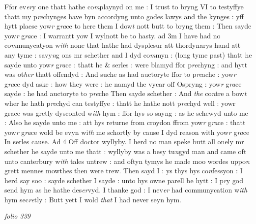 \documentclass[12pt, a4paper]{book}
\begin{document}
Ffor ev\textit{er}y one thatt hathe co\textit{m}playnyd on me : I trust to bryng VI to testyffye thatt my p\textit{re}chynges have byn accordyng unto godes lawys and the kynges : yff hytt plaese yow\textit{r} g\textit{ra}ce to here them I dow\textit{t} nott butt to bryng them : Then sayde yow\textit{r} g\textit{ra}ce : I warrantt yow I wylnott be to hasty.  ad 3m I have had no co\textit{m}munycatyon w\textit{ith} none that hathe had dysplesur att thordynarys hand att any tyme : savy\textit{n}g ons mr schether and I dyd co\textit{m}myn : (long tyme past) thatt he sayde unto  yow\textit{r} g\textit{ra}ce : thatt he \& serles : were blamyd ffor p\textit{re}chyng : and hytt was ot\textit{her} thatt offendyd : And suche as had auctoryte ffor to p\textit{re}ache : yow\textit{r} g\textit{ra}ce dyd aske : how they were : he namyd the vycar off Ospryng : yow\textit{r} g\textit{ra}ce sayde : he had auctoryte to p\textit{re}che Then sayde schether : And \textit{the} co\textit{n}tre a bow\textit{t} wher he hath p\textit{re}chyd can testyffye : thatt he hathe nott p\textit{re}chyd well : yowr grace was gretly dysconted w\textit{ith} hym : ffor hys so sayng : as he schewyd unto me : Also he sayde unto me : att hys returne from croydon ffrom yow\textit{r} g\textit{ra}ce : thatt yow\textit{r }g\textit{ra}ce wold be evyn wi\textit{th} me schortly by cause I dyd reason with yow\textit{r} g\textit{ra}ce In serles cause.   Ad 4  Off doctor wyllyby. I herd no man speke butt all onely mr schether he sayde unto me thatt : wyllyby was a besy tu\textit{n}gyd man and came oft unto canterbury w\textit{ith} tales untrew : and oftyn tymys he made moo wordes uppo\textit{n} grett mennes mowthes then were trew. Then sayd I : ys thys hys co\textit{n}fessyon : I herd say soo : sayde schether I sayde : unto hys owne parell be hytt : I p\textit{r}y god send hym as he hathe des\textit{er}vyd. I thanke god : I nev\textit{er} had communycation w\textit{ith} hym sec\textit{re}tly : Butt yett I wold \textit{that }I had never seyn hym.

\dotfill
					

\textit{folio 339}
\end{document}
